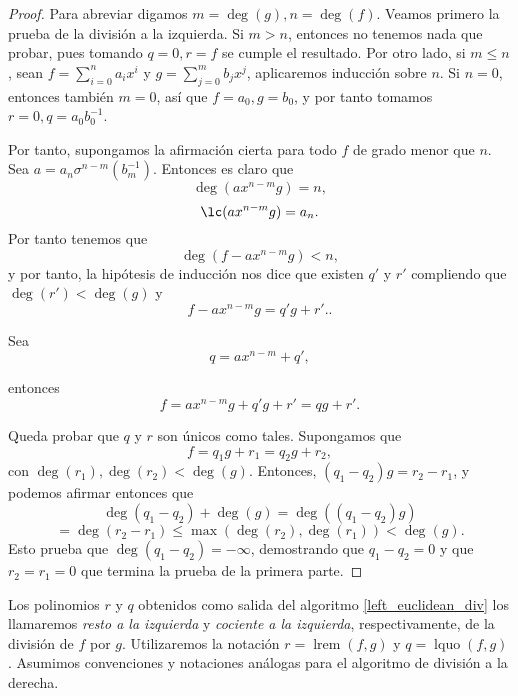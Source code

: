 \begin{proof}
Para abreviar digamos \(m = \deg(g), n = \deg(f)\). Veamos primero la prueba de la división a la izquierda. Si \(m > n\), entonces no tenemos nada que probar, pues tomando  \(q = 0, r = f\) se cumple el resultado. Por otro lado, si \(m \leq n\), sean \(f = \sum_{i=0}^{n} a_i x^i\) y \(g = \sum_{j=0}^{m} b_j x^j\), aplicaremos inducción sobre \(n\). Si \(n = 0\), entonces también \(m = 0\), así que  \(f = a_0, g = b_0\), y por tanto tomamos \(r = 0, q = a_0 b_0^{-1}\).

Por tanto, supongamos la afirmación cierta para todo \(f\) de grado menor que \(n\).  Sea \(a = a_n \sigma^{n-m}(b_m^{-1})\). Entonces es claro que
\[
\deg(ax^{n-m}g) = n,
\]
\[
\lc(ax^{n-m}g) = a_n
.\]
Por tanto tenemos que
\[
\deg(f - a x^{n-m}g) < n,
\]
y por tanto, la hipótesis de inducción nos dice que existen \(q'\) y \(r'\) compliendo que \(\deg(r') < \deg(g)\)  y
\[
f - a x^{n-m}g = q'g + r'.
.\]

Sea
\[
q = a x^{n-m} + q'
,\]

entonces
\[
f = a x^{n-m}g + q'g + r' = qg + r'
.\]

Queda probar que \(q\) y \(r\) son únicos como tales. Supongamos que
\[
f = q_1g + r_1 = q_2g + r_2,
\]
con \(\deg(r_1), \deg(r_2) < \deg(g)\). Entonces, \((q_1 - q_2)g = r_2 - r_1\), y podemos afirmar entonces que
\[
\deg(q_1 - q_2) + \deg(g) = \deg((q_1-q_2)g)
\]
\[
= \deg(r_2-r_1) \leq \max(\deg(r_2), \deg(r_1)) < \deg(g)
.\]
Esto prueba que \(\deg(q_1-q_2) = -\infty\), demostrando que \(q_1 - q_2 = 0\) y que \(r_2 = r_1 = 0\) que termina la prueba de la primera parte.

\end{proof}

Los polinomios \(r\) y \(q\) obtenidos como salida del algoritmo \ref{left_euclidean_div} los llamaremos \textit{resto a la izquierda} y  \textit{cociente a la izquierda}, respectivamente, de la división de \(f\) por \(g\). Utilizaremos la notación \(r = \operatorname{lrem}(f,g)\) y \(q = \operatorname{lquo}(f,g)\). Asumimos convenciones y notaciones análogas para el algoritmo de división a la derecha.

